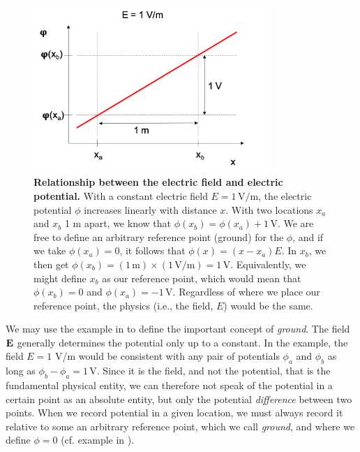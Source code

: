 \begin{figure}[!ht]
\begin{center}
\includegraphics[width=0.8\textwidth]{Figures/Basics/Ground.png}
\end{center}
\caption{\textbf{Relationship between the electric field and electric potential.} With a constant electric field $E = 1\,\si{\volt\per\metre}$, the electric potential $\phi$ increases linearly with distance $x$. With two locations $x_a$ and $x_b$ 1 \si{\metre} apart, we know that $\phi(x_b) = \phi(x_a) + 1\,\si{\volt}$. We are free to define an arbitrary reference point (ground) for the $\phi$, and if we take $\phi(x_a) = 0$, it follows that $\phi(x) = (x-x_a)E$. In $x_b$, we then get $\phi(x_b)=(1\,\si{\metre})\times(1\, \si{\volt\per\metre}) =1\,\si{\volt}$. Equivalently, we might define $x_b$ as our reference point, which would mean that $\phi(x_b) = 0$ and $\phi(x_a) = -1\,\si{\volt}$. Regardless of where we place our reference point, the physics (i.e., the field, $E$) would be the same.
}
\label{fig:Basics:Ground}
\end{figure}

We may use the example in  to define the important concept of \textit{ground}. The field ${\bf E}$ generally determines the potential only up to a constant. In the example, the field $E = 1$ V/m would be consistent with any pair of potentials $\phi_a$ and $\phi_b$ as long as $\phi_b - \phi_a =  1 \,\si{\volt}$. Since it is the field, and not the potential, that is the fundamental physical entity, we can therefore not speak of the potential in a certain point as an absolute entity, but only the potential \textit{difference} between two points. When we record potential in a given location, we must always record it relative to some an arbitrary reference point, which we call \textit{ground}, and where we define $\phi = 0$ (cf. example in ). 

